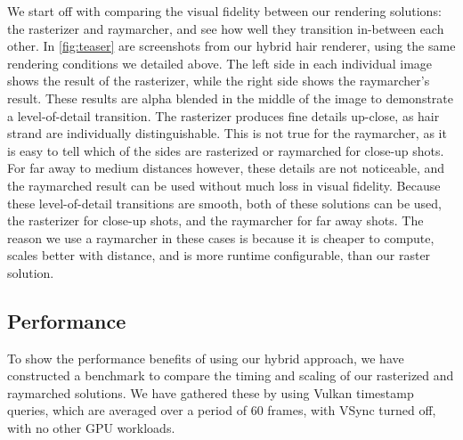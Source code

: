 \documentclass{egpubl}
\begin{document}

We start off with comparing the visual fidelity between our rendering solutions: the rasterizer and raymarcher, and see how well they transition in-between each other. In \cref{fig:teaser} are screenshots from our hybrid hair renderer, using the same rendering conditions we detailed above. The left side in each individual image shows the result of the rasterizer, while the right side shows the raymarcher's result. These results are alpha blended in the middle of the image to demonstrate a level-of-detail transition. The rasterizer produces fine details up-close, as hair strand are individually distinguishable. This is not true for the raymarcher, as it is easy to tell which of the sides are rasterized or raymarched for close-up shots. For far away to medium distances however, these details are not noticeable, and the raymarched result can be used without much loss in visual fidelity. Because these level-of-detail transitions are smooth, both of these solutions can be used, the rasterizer for close-up shots, and the raymarcher for far away shots. The reason we use a raymarcher in these cases is because it is cheaper to compute, scales better with distance, and is more runtime configurable, than our raster solution.


\subsection{Performance} \label{sec:performance}


To show the performance benefits of using our hybrid approach, we have constructed a benchmark to compare the timing and scaling of our rasterized and raymarched solutions. We have gathered these by using Vulkan timestamp queries, which are averaged over a period of 60 frames, with VSync turned off, with no other GPU workloads.
\end{document}
